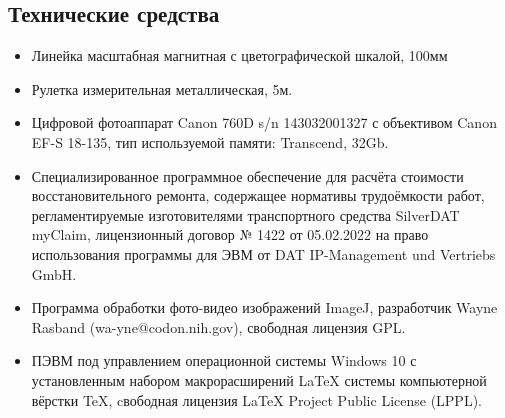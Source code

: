 \subsection{Технические средства}  %
%
\begin{itemize}
%
\item  Линейка масштабная магнитная с цветографической шкалой, 100мм
\item  Рулетка измерительная металлическая, 5м.
\item Цифровой фотоаппарат Canon 760D s/n 143032001327 с объективом Canon EF-S 18-135, тип используемой памяти: Transcend,  32Gb.
%

\item  Специализированное программное обеспечение для расчёта стоимости  восстановительного ремонта, содержащее нормативы трудоёмкости работ, регламентируемые изготовителями транспортного средства  SilverDAT myClaim, лицензионный договор № 1422 от 05.02.2022 на право использования программы для ЭВМ от  DAT IP-Management und Vertriebs GmbH.
%
\item  Программа обработки фото-видео изображений ImageJ, разработчик  Wayne Rasband (wa-yne@codon.nih.gov),
свободная лицензия GPL.
%
\item  ПЭВМ под управлением операционной системы Windows 10 с установленным набором макрорасширений LaTeX системы компьютерной вёрстки TeX, cвободная лицензия LaTeX Project Public License (LPPL). 
%	
	\end{itemize}
